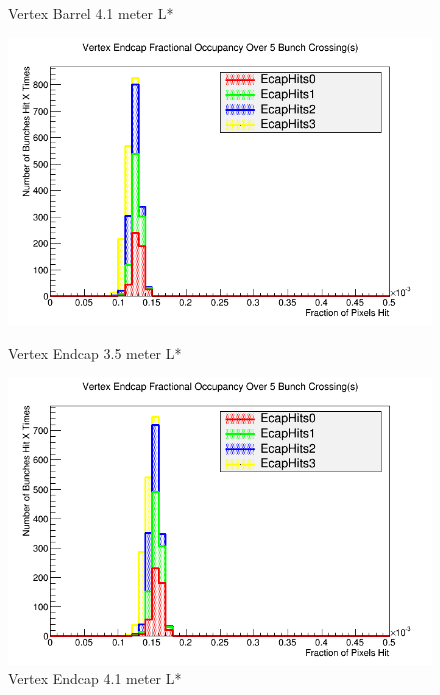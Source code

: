 \documentclass{report}
\begin{document}
\begin{figure}[H]
\begin{minipage}{0.4\textwidth}
                        \caption{Vertex Barrel 4.1 meter L*}
                        \label{lstar_vertex_brl_4.1}
                    \end{minipage}
                \end{figure}
                \begin{figure}[H]
                    \centering
                    \begin{minipage}{0.4\textwidth}
                        \includegraphics[width=\textwidth]{Voccupancy_sidloi3_IR_realign_preqd0shift_5B_ps30_1510212229_ecp}
                        \caption{Vertex Endcap 3.5 meter L*}
                        \label{lstar_vertex_ecp_3.5}
                    \end{minipage}
                    \begin{minipage}{0.4\textwidth}
                        \includegraphics[width=\textwidth]{Voccupancy_sidloi3_IR_realign_5B_ps30_1510211229_ecp}
                        \caption{Vertex Endcap 4.1 meter L*}
                        \label{lstar_vertex_ecp_4.1}
                    \end{minipage}
                \end{figure}
\end{document}
